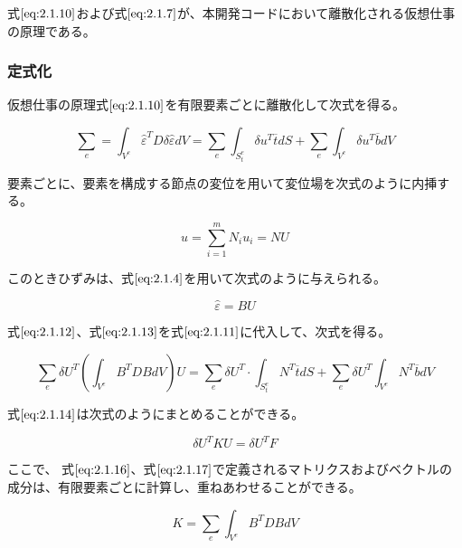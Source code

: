 \documentclass[a4paper,pandoc,ja=standard]{bxjsarticle}
\begin{document}
式\(\eqref{eq:2.1.10}\)および式\(\eqref{eq:2.1.7}\)が、本開発コードにおいて離散化される仮想仕事の原理である。

\hypertarget{ux5b9aux5f0fux5316}{%
\subsubsection{定式化}\label{ux5b9aux5f0fux5316}}

仮想仕事の原理式\(\eqref{eq:2.1.10}\)を有限要素ごとに離散化して次式を得る。

\begin{equation}
\sum_{e} = \int_{V^e} \hat{\varepsilon}^T D \delta \hat{\varepsilon} dV = \sum_{e} \int_{S^e_t}
\delta u^T \overline{t} dS + \sum_{e} \int_{V^e} \delta u^T \overline{b} dV
\label{eq:2.1.11}
\end{equation}

要素ごとに、要素を構成する節点の変位を用いて変位場を次式のように内挿する。

\begin{equation}
u = \sum^m_{i=1} N_i u_i = N U
\label{eq:2.1.12}
\end{equation}

このときひずみは、式\(\eqref{eq:2.1.4}\)を用いて次式のように与えられる。

\begin{equation}
\hat{\varepsilon} = B U
\label{eq:2.1.13}
\end{equation}

式\(\eqref{eq:2.1.12}\)、式\(\eqref{eq:2.1.13}\)を式\(\eqref{eq:2.1.11}\)に代入して、次式を得る。

\begin{equation}
\sum_e \delta U^T ( \int_{V^e} B^T DB dV )
U = \sum_e \delta U^T \cdot \int_{S_t^e}
N^T \overline{t} dS + \sum_{e} \delta U^T \int_{V^e} N^T
\overline{b} dV
\label{eq:2.1.14}
\end{equation}

式\(\eqref{eq:2.1.14}\)は次式のようにまとめることができる。

\begin{equation}
\delta U^T K U = \delta U^T F
\label{eq:2.1.15}
\end{equation}

ここで、
式\(\eqref{eq:2.1.16}\)、式\(\eqref{eq:2.1.17}\)で定義されるマトリクスおよびベクトルの成分は、有限要素ごとに計算し、重ねあわせることができる。

\begin{equation}
K = \sum_e \int_{V^e} B^T DB dV
\label{eq:2.1.16}
\end{equation}
\end{document}
